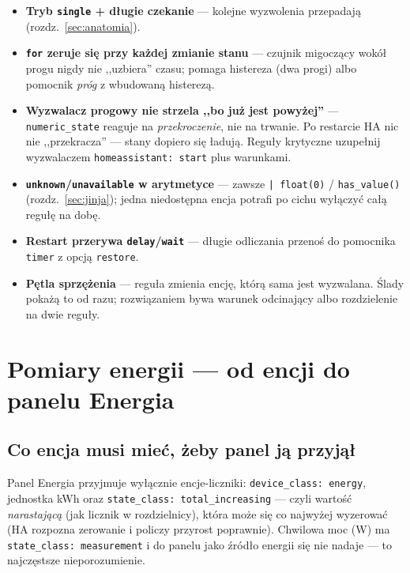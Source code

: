 \documentclass[11pt,a4paper]{article}
\begin{document}
\begin{itemize}
\item \textbf{Tryb \texttt{single} + długie czekanie} --- kolejne wyzwolenia przepadają (rozdz.~\ref{sec:anatomia}).
\item \textbf{\texttt{for} zeruje się przy każdej zmianie stanu} --- czujnik migoczący wokół progu nigdy nie ,,uzbiera'' czasu; pomaga histereza (dwa progi) albo pomocnik \emph{próg} z wbudowaną histerezą.
\item \textbf{Wyzwalacz progowy nie strzela ,,bo już jest powyżej''} --- \texttt{numeric\_state} reaguje na \emph{przekroczenie}, nie na trwanie. Po restarcie HA nic nie ,,przekracza'' --- stany dopiero się ładują. Reguły krytyczne uzupełnij wyzwalaczem \texttt{homeassistant: start} plus warunkami.
\item \textbf{\texttt{unknown}/\texttt{unavailable} w arytmetyce} --- zawsze \texttt{| float(0)} / \texttt{has\_value()} (rozdz.~\ref{sec:jinja}); jedna niedostępna encja potrafi po cichu wyłączyć całą regułę na dobę.
\item \textbf{Restart przerywa \texttt{delay}/\texttt{wait}} --- długie odliczania przenoś do pomocnika \texttt{timer} z opcją \texttt{restore}.
\item \textbf{Pętla sprzężenia} --- reguła zmienia encję, którą sama jest wyzwalana. Ślady pokażą to od razu; rozwiązaniem bywa warunek odcinający albo rozdzielenie na dwie reguły.
\end{itemize}

\section{Pomiary energii --- od encji do panelu Energia}
\label{sec:energia}

\subsection{Co encja musi mieć, żeby panel ją przyjął}

Panel Energia przyjmuje wyłącznie encje-liczniki: \texttt{device\_class: energy}, jednostka kWh oraz \texttt{state\_class: total\_increasing} --- czyli wartość \emph{narastającą} (jak licznik w rozdzielnicy), która może się co najwyżej wyzerować (HA rozpozna zerowanie i policzy przyrost poprawnie). Chwilowa moc (W) ma \texttt{state\_class: measurement} i do panelu jako źródło energii się nie nadaje --- to najczęstsze nieporozumienie.
\end{document}

